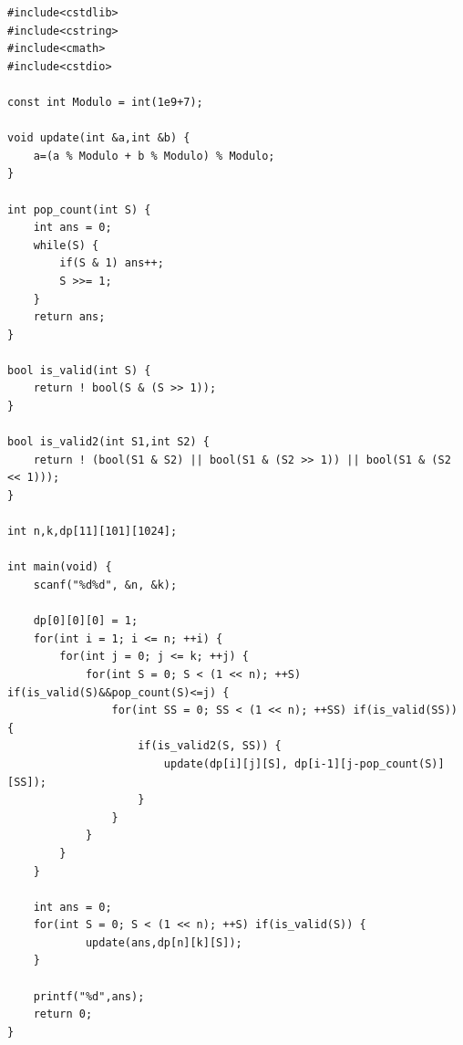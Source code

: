 \documentclass{article}
\begin{document}
\begin{verbatim}
#include<cstdlib>
#include<cstring>
#include<cmath>
#include<cstdio>

const int Modulo = int(1e9+7);

void update(int &a,int &b) {
    a=(a % Modulo + b % Modulo) % Modulo;
}

int pop_count(int S) {
    int ans = 0;
    while(S) {
        if(S & 1) ans++;
        S >>= 1;
    }
    return ans;
}

bool is_valid(int S) {
    return ! bool(S & (S >> 1));
}

bool is_valid2(int S1,int S2) {
    return ! (bool(S1 & S2) || bool(S1 & (S2 >> 1)) || bool(S1 & (S2 << 1)));
}

int n,k,dp[11][101][1024];

int main(void) {
    scanf("%d%d", &n, &k);

    dp[0][0][0] = 1;
    for(int i = 1; i <= n; ++i) {
        for(int j = 0; j <= k; ++j) {
            for(int S = 0; S < (1 << n); ++S) if(is_valid(S)&&pop_count(S)<=j) {
                for(int SS = 0; SS < (1 << n); ++SS) if(is_valid(SS)) {
                    if(is_valid2(S, SS)) {
                        update(dp[i][j][S], dp[i-1][j-pop_count(S)][SS]);
                    }
                }
            }
        }
    }

    int ans = 0;
    for(int S = 0; S < (1 << n); ++S) if(is_valid(S)) {
            update(ans,dp[n][k][S]);
    }

    printf("%d",ans);
    return 0;
}
\end{verbatim}

\end{document}
